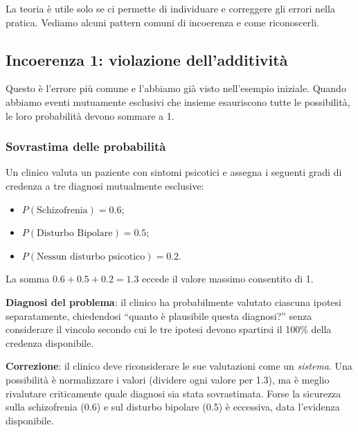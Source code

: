 \documentclass[
  italian,
  letterpaper,
  a4paper,
  11pt,
  open=any]{scrbook}
\providecommand{\tightlist}{%
  \setlength{\itemsep}{0pt}\setlength{\parskip}{0pt}}
\theoremstyle{plain}
\theoremstyle{definition}
\theoremstyle{definition}
\theoremstyle{remark}
\begin{document}
La teoria è utile solo se ci permette di individuare e correggere gli
errori nella pratica. Vediamo alcuni pattern comuni di incoerenza e come
riconoscerli.

\subsection{Incoerenza 1: violazione
dell'additività}\label{incoerenza-1-violazione-delladditivituxe0}

Questo è l'errore più comune e l'abbiamo già visto nell'esempio
iniziale. Quando abbiamo eventi mutuamente esclusivi che insieme
esauriscono tutte le possibilità, le loro probabilità devono sommare a
1.

\begin{tcolorbox}[enhanced jigsaw, arc=.35mm, bottomrule=.15mm, bottomtitle=1mm, breakable, colback=white, colbacktitle=quarto-callout-warning-color!10!white, colframe=quarto-callout-warning-color-frame, coltitle=black, left=2mm, leftrule=.75mm, opacityback=0, opacitybacktitle=0.6, rightrule=.15mm, title=\textcolor{quarto-callout-warning-color}{\faExclamationTriangle}\hspace{0.5em}{Esempio di incoerenza clinica}, titlerule=0mm, toprule=.15mm, toptitle=1mm]

\subsubsection*{Sovrastima delle
probabilità}\label{sovrastima-delle-probabilituxe0}

Un clinico valuta un paziente con sintomi psicotici e assegna i seguenti
gradi di credenza a tre diagnosi mutualmente esclusive:

\begin{itemize}
\tightlist
\item
  \(P(\text{Schizofrenia}) = 0.6\);
\item
  \(P(\text{Disturbo Bipolare}) = 0.5\);\\
\item
  \(P(\text{Nessun disturbo psicotico}) = 0.2\).
\end{itemize}

La somma \(0.6 + 0.5 + 0.2 = 1.3\) eccede il valore massimo consentito
di 1.

\textbf{Diagnosi del problema}: il clinico ha probabilmente valutato
ciascuna ipotesi separatamente, chiedendosi ``quanto è plausibile questa
diagnosi?'' senza considerare il vincolo secondo cui le tre ipotesi
devono spartirsi il 100\% della credenza disponibile.

\textbf{Correzione}: il clinico deve riconsiderare le sue valutazioni
come un \emph{sistema}. Una possibilità è normalizzare i valori
(dividere ogni valore per 1.3), ma è meglio rivalutare criticamente
quale diagnosi sia stata sovrastimata. Forse la sicurezza sulla
schizofrenia (0.6) e sul disturbo bipolare (0.5) è eccessiva, data
l'evidenza disponibile.

\end{tcolorbox}
\end{document}
